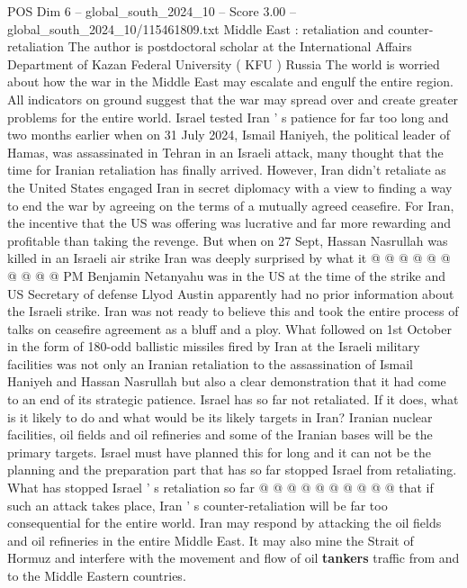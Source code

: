 \begin{textsample}{POS Dim 6 – global\_south\_2024\_10 – Score 3.00 – global\_south\_2024\_10/115461809.txt}  \label{ex:f6_pos_405}
Middle East : retaliation and counter-retaliation The author is postdoctoral scholar at the International Affairs Department of Kazan Federal University ( KFU ) Russia The world is worried about how the war in the Middle East may escalate and engulf the entire region.
All indicators on ground suggest that the war may spread over and create greater problems for the entire world.
Israel tested Iran ' s patience for far too long and two months earlier when on 31 July 2024, Ismail Haniyeh, the political leader of Hamas, was assassinated in Tehran in an Israeli attack, many thought that the time for Iranian retaliation has finally arrived.
However, Iran didn't retaliate as the United States engaged Iran in secret diplomacy with a view to finding a way to end the war by agreeing on the terms of a mutually agreed ceasefire.
For Iran, the incentive that the US was offering was lucrative and far more rewarding and profitable than taking the revenge.
But when on 27 Sept, Hassan Nasrullah was killed in an Israeli air strike Iran was deeply surprised by what it @ @ @ @ @ @ @ @ @ @ PM Benjamin Netanyahu was in the US at the time of the strike and US Secretary of defense Llyod Austin apparently had no prior information about the Israeli strike.
Iran was not ready to believe this and took the entire process of talks on ceasefire agreement as a bluff and a ploy.
What followed on 1st October in the form of 180-odd ballistic missiles fired by Iran at the Israeli military facilities was not only an Iranian retaliation to the assassination of Ismail Haniyeh and Hassan Nasrullah but also a clear demonstration that it had come to an end of its strategic patience.
Israel has so far not retaliated.
If it does, what is it likely to do and what would be its likely targets in Iran?
Iranian nuclear facilities, oil fields and oil refineries and some of the Iranian bases will be the primary targets.
Israel must have planned this for long and it can not be the planning and the preparation part that has so far stopped Israel from retaliating.
What has stopped Israel ' s retaliation so far @ @ @ @ @ @ @ @ @ @ that if such an attack takes place, Iran ' s counter-retaliation will be far too consequential for the entire world.
Iran may respond by attacking the oil fields and oil refineries in the entire Middle East.
It may also mine the Strait of Hormuz and interfere with the movement and flow of oil \textbf{tankers} traffic from and to the Middle Eastern countries.

\end{textsample}
